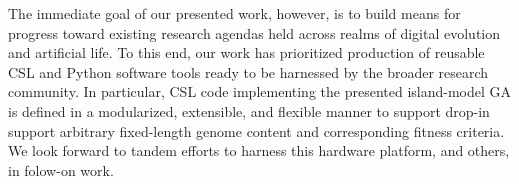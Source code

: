 The immediate goal of our presented work, however, is to build means for progress toward existing research agendas held across realms of digital evolution and artificial life.
To this end, our work has prioritized production of reusable CSL and Python software tools ready to be harnessed by the broader research community.
In particular, CSL code implementing the presented island-model GA is defined in a modularized, extensible, and flexible manner to support drop-in support arbitrary fixed-length genome content and corresponding fitness criteria.
We look forward to tandem efforts to harness this hardware platform, and others, in folow-on work.







